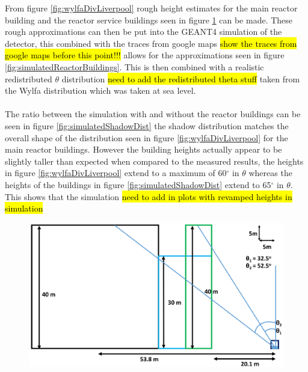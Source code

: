 From figure \ref{fig:wylfaDivLiverpool} rough height estimates for the main reactor building and the reactor service buildings seen in figure \ref{fig:wylfaHieghts} can be made. These rough approximations can then be put into the GEANT4 simulation of the detector, this combined with the traces from google maps \hl{show the traces from google maps before this point!!!} allows for the approximations seen in figure \ref{fig:simulatedReactorBuildings}. This is then combined with a realistic redistributed $\theta$ distribution \hl{need to add the redistributed theta stuff} taken from the Wylfa distribution which was taken at sea level. 
\\\\ The ratio between the simulation with and without the reactor buildings can be seen in figure \ref{fig:simulatedShadowDist} the shadow distribution matches the overall shape of the distribution seen in figure \ref{fig:wylfaDivLiverpool} for the main reactor buildings. However the building heights actually appear to be slightly taller than expected when compared to the measured results, the heights in figure \ref{fig:wylfaDivLiverpool} extend to a maximum of 60$^\circ$ in $\theta$ whereas the heights of the buildings in figure \ref{fig:simulatedShadowDist} extend to 65$^\circ$ in $\theta$. This shows that the simulation \hl{need to add in plots with revamped heights in simulation}

\begin{figure}[H]
 \centering
 \includegraphics[width=1.0\linewidth]{Chapter5/Figs/Raster/wyflaHieghtsNew.png}
 \label{fig:wylfaHieghts}
\end{figure}

